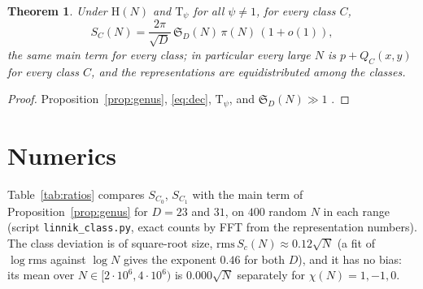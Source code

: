 \documentclass[11pt]{amsart}
\newtheorem{theorem}{Theorem}[section]
\theoremstyle{remark}
\newcommand{\sS}{\mathfrak S}
\begin{document}
\begin{theorem}\label{thm:every}
Under $\mathrm H(N)$ and $\mathrm T_\psi$ for all $\psi\ne1$, for every class $C$,
\[
S_C(N)=\frac{2\pi}{\sqrt D}\,\sS_D(N)\,\pi(N)\,(1+o(1)),
\]
the same main term for every class; in particular every large $N$ is $p+Q_C(x,y)$ for every class $C$, and the representations are equidistributed among the classes.
\end{theorem}
\begin{proof}
Proposition~\ref{prop:genus}, \eqref{eq:dec}, $\mathrm T_\psi$, and $\sS_D(N)\gg1$ \cite[Theorem~1.2]{ChenL}.
\end{proof}

\section{Numerics}
Table~\ref{tab:ratios} compares $S_{C_0}$, $S_{C_1}$ with the main term of Proposition~\ref{prop:genus} for $D=23$ and $31$, on $400$ random $N$ in each range (script \texttt{linnik\_class.py}, exact counts by FFT from the representation numbers). The class deviation is of square-root size, $\mathrm{rms}\,S_c(N)\approx0.12\sqrt N$ (a fit of $\log\mathrm{rms}$ against $\log N$ gives the exponent $0.46$ for both $D$), and it has no bias: its mean over $N\in[2\cdot10^6,4\cdot10^6)$ is $0.000\sqrt N$ separately for $\chi(N)=1,-1,0$.
\end{document}
